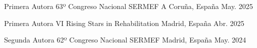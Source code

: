 

\begin{cventries}

  \cventry
    {Primera Autora} %
    {63º Congreso Nacional SERMEF} %
    {A Coruña, España} %
    {May. 2025} %
    {}

  \cventry
    {Primera Autora} %
    {VI Rising Stars in Rehabilitation} %
    {Madrid, España} %
    {Abr. 2025} %
    {}

  \cventry
    {Segunda Autora} %
    {62º Congreso Nacional SERMEF} %
    {Madrid, España} %
    {May. 2024} %
    {}

\end{cventries}
